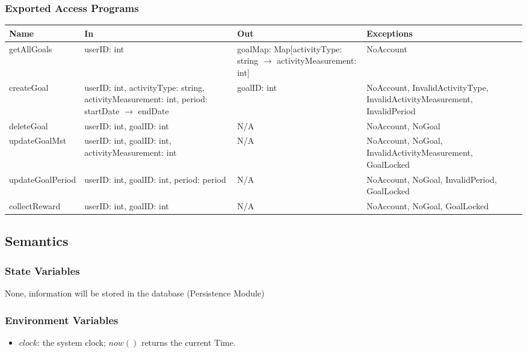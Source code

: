\documentclass[12pt, titlepage]{article}
\begin{document}
\subsubsection{Exported Access Programs}
\begin{center}
\small
\renewcommand{\arraystretch}{1.2}
\begin{tabularx}{\textwidth}{
  >{\raggedright\arraybackslash}p{3.4cm}
  >{\raggedright\arraybackslash}X
  >{\raggedright\arraybackslash}p{3.4cm}
  >{\raggedright\arraybackslash}p{4.4cm}}
\hline
\textbf{Name} & \textbf{In} & \textbf{Out} & \textbf{Exceptions} \\
\hline
getAllGoals & userID: int & goalMap: Map[activityType: string $\longrightarrow$ activityMeasurement: int] & NoAccount \\
createGoal & userID: int, activityType: string, activityMeasurement: int, period: startDate $\longrightarrow$ endDate & goalID: int & NoAccount, InvalidActivityType, InvalidActivityMeasurement, InvalidPeriod \\
deleteGoal & userID: int, goalID: int & N/A & NoAccount, NoGoal \\
updateGoalMst & userID: int, goalID: int, activityMeasurement: int & N/A & NoAccount, NoGoal, InvalidActivityMeasurement, GoalLocked\\
updateGoalPeriod & userID: int, goalID: int, period: period & N/A & NoAccount, NoGoal, InvalidPeriod, GoalLocked\\
collectReward & userID: int, goalID: int & N/A & NoAccount, NoGoal, GoalLocked \\
\hline
\end{tabularx}
\end{center}

\subsection{Semantics}

\subsubsection{State Variables}
None, information will be stored in the database (Persistence Module)

\subsubsection{Environment Variables}
\begin{itemize}
    \item $\mathit{clock}$: the system clock; $\mathit{now}()$ returns the current Time.
\end{itemize}
\end{document}

